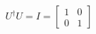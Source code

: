 \documentclass[preview]{standalone}
\begin{document}
\begin{align*}
U^\dagger U = I = \begin{bmatrix} 1 & 0 \\ 0 & 1 \end{bmatrix}
\end{align*}
\end{document}
